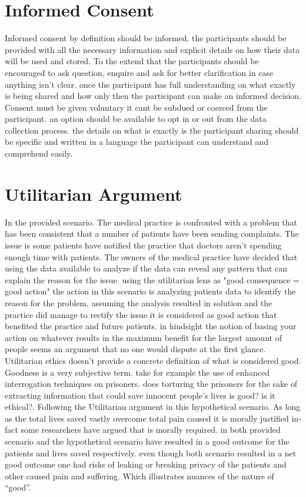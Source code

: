 \documentclass{article}
\begin{document}
	\newpage
\section{Informed Consent}

Informed consent by definition should be informed. the participants should be provided with all the necessary information and explicit details on how their data will be used and stored. To the extend that the participants should be encouraged to ask question, enquire and ask for better clarification in case anything isn't clear. once the participant has full understanding on what exactly is being shared and how only then the participant can make an informed decision. Consent must be given voluntary it cant be subdued or coerced from the participant. an option should be available to opt in or out from the data collection process. the details on what is exactly is the participant sharing should be specific and written in a language the participant can understand and comprehend easily. 


\section{Utilitarian Argument}
In the provided scenario. The medical practice is confronted with a problem that has been consistent that a number of patients have been sending complaints. The issue is some patients have notified the practice that doctors aren't spending enough time with patients. The owners of the medical practice have decided that using the data available to analyze if the data can reveal any pattern that can explain the reason for the issue. using the utilitarian lens as "good consequence = good action" the action in this scenario is analyzing patients data to identify the reason for the problem, assuming the analysis resulted in solution and the practice did manage to rectify the issue it is considered as good action that benefited the practice and future patients. in hindsight the notion of basing your action on whatever results in the maximum benefit for the largest amount of people seems an argument that no one would dispute at the first glance. Utilitarian ethics doesn't provide a concrete definition of what is considered good. Goodness is a very subjective term. take for example the use of enhanced interrogation techniques on prisoners. does torturing the prisoners for the sake of extracting information that could save innocent people's lives is good? is it ethical?. Following the Utilitarian argument in this hypothetical scenario. As long as the  total lives saved vastly overcome total pain caused it is morally justified in-fact some researchers have argued that is morally required. in both provided scenario and the hypothetical scenario have resulted in a good outcome for the patients and lives saved respectively. even though both scenario resulted in a net good outcome one had risks of leaking or breaking privacy of the patients and other caused pain and suffering. Which illustrates nuances of the nature of “good”.
\end{document}

